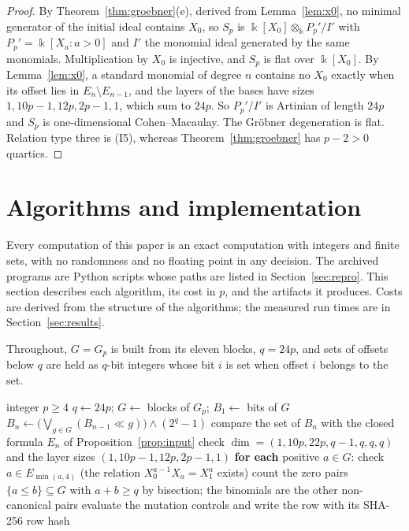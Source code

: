 \documentclass[11pt]{article}
\theoremstyle{definition}
\theoremstyle{remark}
\newcommand{\kfield}{\Bbbk}
\begin{document}
\begin{proof}
By Theorem~\ref{thm:groebner}(e), derived from Lemma~\ref{lem:x0}, no minimal generator of the initial ideal contains $X_0$,
so $S_p$ is $\kfield[X_0]\otimes_\kfield P_p'/I'$ with $P_p'=\kfield[X_a:a>0]$ and $I'$ the monomial
ideal generated by the same monomials. Multiplication by $X_0$ is injective, and $S_p$ is flat
over $\kfield[X_0]$. By Lemma~\ref{lem:x0}, a standard monomial of degree $n$ contains no $X_0$ exactly when its
offset lies in $E_n\setminus E_{n-1}$, and the layers of the bases have sizes
$1,10p-1,12p,2p-1,1$, which sum to $24p$. So $P_p'/I'$ is Artinian of length $24p$ and $S_p$ is
one-dimensional Cohen--Macaulay. The Gr\"obner degeneration is flat. Relation type three is
(I5), whereas Theorem~\ref{thm:groebner} has $p-2>0$ quartics.
\end{proof}

\section{Algorithms and implementation}\label{sec:algorithms}

Every computation of this paper is an exact computation with integers and finite sets, with no
randomness and no floating point in any decision. The archived programs are Python scripts
whose paths are listed in Section~\ref{sec:repro}. This section describes each algorithm, its
cost in $p$, and the artifacts it produces. Costs are derived from the structure of the
algorithms; the measured run times are in Section~\ref{sec:results}.

Throughout, $G=G_p$ is built from its eleven blocks, $q=24p$, and sets of offsets below $q$ are held as
$q$-bit integers whose bit $i$ is set when offset $i$ belongs to the set.

\begin{algorithm}[ht]
\caption{Truncated sumset sweep for one parameter $p$ (computations EXP-025 and EXP-026).}
\label{alg:sumset}
\begin{algorithmic}[1]
\Require integer $p\geq4$
\State $q\gets24p$; $G\gets$ blocks of $G_p$; $B_1\gets$ bits of $G$
  \State $B_n\gets\bigl(\bigvee_{g\in G}(B_{n-1}\ll g)\bigr)\wedge(2^q-1)$
  \State compare the set of $B_n$ with the closed formula $E_n$ of Proposition~\ref{prop:input}
\EndFor
\State check $\dim=(1,10p,22p,q-1,q,q,q)$ and the layer sizes $(1,10p-1,12p,2p-1,1)$
\State \textbf{for each} positive $a\in G$: check $a\in E_{\min(a,4)}$ (the relation $X_0^{a-1}X_a=X_1^a$ exists)
\State count the zero pairs $\{a\leq b\}\subseteq G$ with $a+b\geq q$ by bisection; the binomials are the other non-canonical pairs
\State evaluate the mutation controls and write the row with its SHA-256 row hash
\end{algorithmic}
\end{algorithm}
\end{document}
